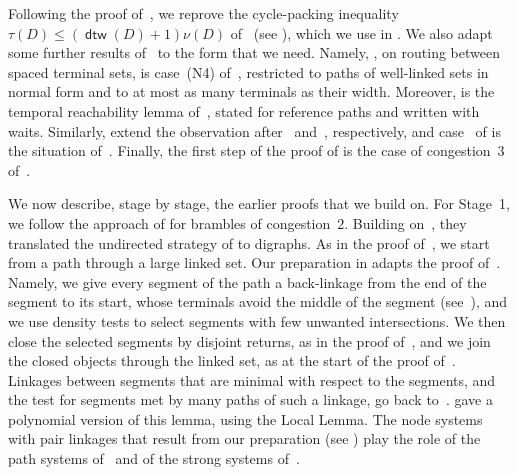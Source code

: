 \documentclass[fontsize=12pt,leading=14pt]{fullpaper}
\DeclareMathOperator{\dtw}{\mathsf{dtw}}
\newcounter{step}
\begin{document}
Following the proof of~\cite[Lemma~4.2]{AKKW16}, we reprove the cycle-packing inequality $\tau(D)\le(\dtw(D)+1)\nu(D)$ of~\cite[conference version, Lemma~3]{MMPRS22} (see ), which we use in .
We also adapt some further results of~\cite{HKMM26a,HKMM26b} to the form that we need.
Namely, , on routing between spaced terminal sets, is case~(N4) of~\cite[Lemma~8.8]{HKMM26a}, restricted to paths of well-linked sets in normal form and to at most as many terminals as their width.
Moreover,  is the temporal reachability lemma of~\cite[Lemma~6.18]{HKMM26a}, stated for reference paths and written with waits.
Similarly,  extend the observation after~\cite[Definition~2.3]{HKMM26a} and~\cite[Observation~8.9]{HKMM26a}, respectively, and case~ of  is the situation of~\cite[Lemma~4.2]{HKMM26b}.
Finally, the first step of the proof of  is the case of congestion~$3$ of~\cite[Lemma~2.3]{HKMM26b}.

We now describe, stage by stage, the earlier proofs that we build on.
For Stage~1, we follow the approach of \textcite{CLNS26} for brambles of congestion~$2$.
Building on~\cite{MPRS22}, they translated the undirected strategy of \textcite{RW12} to digraphs.
As in the proof of~\cite[Theorem~6.1]{CLNS26}, we start from a path through a large linked set.
Our preparation in  adapts the proof of~\cite[Lemma~4.13]{CLNS26}.
Namely, we give every segment of the path a back-linkage from the end of the segment to its start, whose terminals avoid the middle of the segment (see~\cite[Figure~1]{CLNS26}), and we use density tests to select segments with few unwanted intersections.
We then close the selected segments by disjoint returns, as in the proof of~\cite[Lemma~4.13]{CLNS26}, and we join the closed objects through the linked set, as at the start of the proof of~\cite[Lemma~5.2]{CLNS26}.
Linkages between segments that are minimal with respect to the segments, and the test for segments met by many paths of such a linkage, go back to~\cite[Lemma~4.7]{KawarabayashiK15}.
\textcite[Lemma~5.11]{HKMM26a} gave a polynomial version of this lemma, using the Local Lemma.
The node systems with pair linkages that result from our preparation (see ) play the role of the path systems of~\cite[Definition~4.5]{KawarabayashiK15} and of the strong systems of~\cite[Definition~5.1]{CLNS26}.
\end{document}
